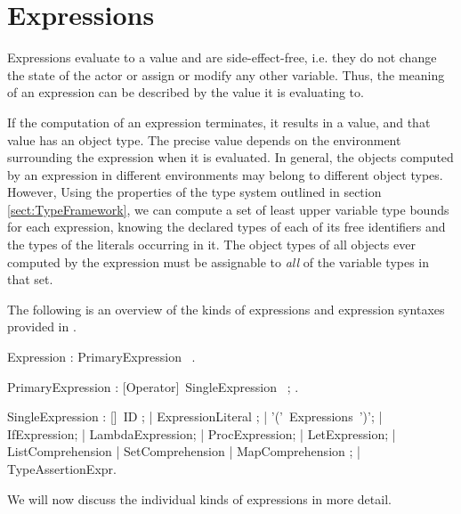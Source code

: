 
\chapter{Expressions}\label{sect:Expressions}

Expressions evaluate to a value and are
side-effect-free, i.e. they do not change the state of the actor or
assign or modify any other variable. Thus, the meaning of an expression
can be described by the value it is evaluating to.

  If the
computation of an expression terminates, it results in a value, and
that value has an object type. The precise value depends on the
environment surrounding the expression when it is evaluated. In
general, the objects computed by an expression in different
environments may belong to different object types. However, Using the
properties of the type system outlined in section
\ref{sect:TypeFramework}, we can compute a set of least upper variable
type bounds for each expression, knowing the declared types of each of
its free identifiers and the types of the literals occurring in it.
The object types of all objects ever computed by the expression must
be assignable to {\em all} of the variable types in that set.


 The following is an overview of the kinds
of expressions and expression syntaxes provided in \Cal.

 

\bgr

Expression : PrimaryExpression~ .

PrimaryExpression : [Operator]~SingleExpression~ ;
      .

SingleExpression : [\kwOld]~ID ;
     | ExpressionLiteral ;
     | '('~Expressions~')';
     | IfExpression;
     | LambdaExpression;
     | ProcExpression;
     | LetExpression;
     | ListComprehension | SetComprehension | MapComprehension ;
     | TypeAssertionExpr.

\egr

We will now discuss the individual kinds of expressions in more detail.

